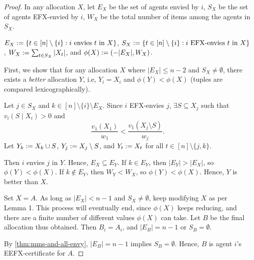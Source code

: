 \begin{proof}
In any allocation $X$, let
$E_X$ be the set of agents envied by $i$,
$S_X$ be the set of agents EFX-envied by $i$,
$W_X$ be the total number of items among the agents in $S_X$.

$E_X := \{t \in [n] \setminus \{i\}: i \textrm{ envies } t \textrm{ in } X\}$,
$S_X := \{t \in [n] \setminus \{i\}: i \textrm{ EFX-envies } t \textrm{ in } X\}$,
$W_X := \sum_{t \in S_X} |X_t|$, and $\phi(X) := (-|E_X|, W_X)$.

First, we show that for any allocation $X$ where $|E_X| \le n-2$ and $S_X \neq \emptyset$,
there exists a \emph{better} allocation $Y$, i.e, $Y_i = X_i$ and $\phi(Y) < \phi(X)$
(tuples are compared lexicographically).

Let $j \in S_X$ and $k \in [n] \setminus \{i\} \setminus E_X$.
Since $i$ EFX-envies $j$, $\exists S \subseteq X_j$ such that $v_i(S \mid X_i) > 0$ and
\[ \frac{v_1(X_1)}{w_1} < \frac{v_1(X_j \setminus S)}{w_j}. \]
Let $Y_k := X_k \cup S$, $Y_j := X_j \setminus S$,
and $Y_t := X_t$ for all $t \in [n] \setminus \{j, k\}$.

Then $i$ envies $j$ in $Y$. Hence, $E_X \subseteq E_Y$.
If $k \in E_Y$, then $|E_Y| > |E_X|$, so $\phi(Y) < \phi(X)$.
If $k \not\in E_Y$, then $W_Y < W_X$, so $\phi(Y) < \phi(X)$.
Hence, $Y$ is better than $X$.

Set $X = A$. As long as $|E_X| < n-1$ and $S_X \neq \emptyset$,
keep modifying $X$ as per Lemma 1.
This process will eventually end, since $\phi(X)$ keeps reducing,
and there are a finite number of different values $\phi(X)$ can take.
Let $B$ be the final allocation thus obtained.
Then $B_i = A_i$, and $|E_B| = n-1$ or $S_B = \emptyset$.

By \cref{thm:mms-and-all-envy},
$|E_B| = n-1$ implies $S_B = \emptyset$.
Hence, $B$ is agent $i$'s EEFX-certificate for $A$.
\end{proof}


